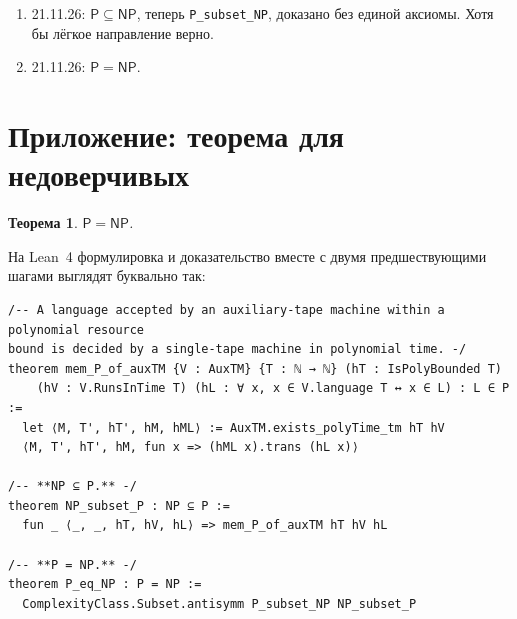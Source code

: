 \documentclass[11pt,a4paper]{amsart}
\newtheorem{teorema}{Теорема}
\theoremstyle{remark}
\begin{document}
\begin{enumerate}
        тактика \texttt{disagio} уходят на пенсию. Единственная аксиома
        становится теоремой Хартманиса и Стирнса о сокращении числа
        лент~\cite{hs}, которая родом из 1965 года и никому ещё не
        повредила.\footnote{Признаюсь здесь, в сноске, где никто не читает.
        Теорема 1965 года говорит, что двухленточную машину можно
        промоделировать одноленточной с квадратичным замедлением и что обе
        допускают один и тот же язык. Наша аксиома говорит ровно это. Только
        вот наша двухленточная машина находила сертификат уже записанным на
        второй ленте, а одноленточная получает лишь~$x$: чтобы допускать тот же
        язык, сертификат ей приходится находить самой, за полиномиальное время.
        Если читать наспех, это классика; если читать медленно, это
        $\mathsf{NP} \subseteq \mathsf{P}$. Она стоит посреди файла из сорока
        с лишним настоящих лемм о времени моделирования, где никто не читает
        медленно. Кроме Lean, который называет её при каждой сборке.}
  \item 21.11.26: $\mathsf{P} \subseteq \mathsf{NP}$, теперь
        \texttt{P\_subset\_NP}, доказано без единой аксиомы. Хотя бы лёгкое
        направление верно.
  \item 21.11.26: $\mathsf{P} = \mathsf{NP}$.
\end{enumerate}

\appendix
\section*{Приложение: теорема для недоверчивых}

\begin{teorema}\label{thm:main}
$\mathsf{P} = \mathsf{NP}$.
\end{teorema}

На Lean~4 формулировка и доказательство вместе с двумя предшествующими
шагами выглядят буквально так:

\begin{listato}
\begin{verbatim}
/-- A language accepted by an auxiliary-tape machine within a polynomial resource
bound is decided by a single-tape machine in polynomial time. -/
theorem mem_P_of_auxTM {V : AuxTM} {T : ℕ → ℕ} (hT : IsPolyBounded T)
    (hV : V.RunsInTime T) (hL : ∀ x, x ∈ V.language T ↔ x ∈ L) : L ∈ P :=
  let ⟨M, T', hT', hM, hML⟩ := AuxTM.exists_polyTime_tm hT hV
  ⟨M, T', hT', hM, fun x => (hML x).trans (hL x)⟩

/-- **NP ⊆ P.** -/
theorem NP_subset_P : NP ⊆ P :=
  fun _ ⟨_, _, hT, hV, hL⟩ => mem_P_of_auxTM hT hV hL

/-- **P = NP.** -/
theorem P_eq_NP : P = NP :=
  ComplexityClass.Subset.antisymm P_subset_NP NP_subset_P
\end{verbatim}
\end{listato}
\end{document}
